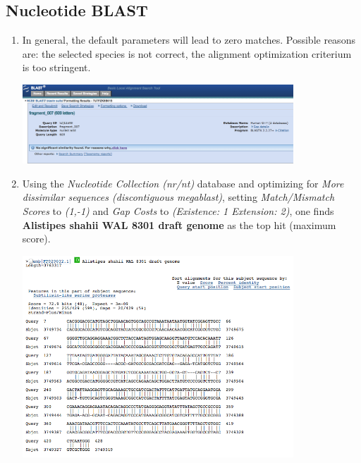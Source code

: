 \documentclass[a4paper,11pt]{article}
\begin{document}
\subsection{Nucleotide BLAST}

\begin{enumerate}
\item In general, the default parameters will lead to zero matches. Possible reasons are: the selected species is not correct, the alignment optimization criterium is too stringent.

\vspace{0.5cm}
\begin{center}
\includegraphics[width=0.8\textwidth]{blastn1.png}
\end{center}
\vspace{0.5cm}

\item Using the \textit{Nucleotide Collection (nr/nt)} database and optimizing for \textit{More dissimilar sequences
(discontiguous megablast)}, setting \textit{Match/Mismatch Scores} to \textit{(1,-1)} and \textit{Gap Costs} to \textit{(Existence: 1 Extension: 2)}, one finds \textbf{Alistipes shahii WAL 8301 draft genome} as the top hit (maximum score).

\vspace{0.5cm}
\begin{center}
\includegraphics[width=0.8\textwidth]{blastn2.png}
\end{center}
\vspace{0.5cm}


\end{enumerate}
\end{document}
